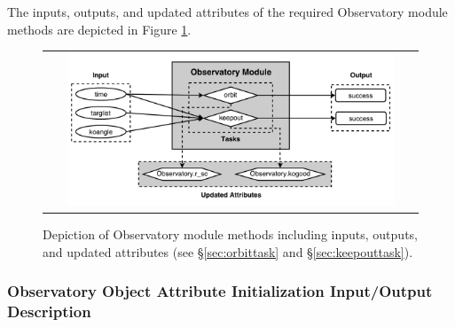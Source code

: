 \documentclass[cleanfoot]{asme2ej}
\newcommand{\reffig}[1]{Figure \ref{#1}}
\begin{document}
The inputs, outputs, and updated attributes of the required Observatory module methods are depicted in  \reffig{fig:observatorymodule}.

\begin{figure}[ht]
    \begin{center}
        \begin{tabular}{c}
             \includegraphics[width=0.9\textwidth]{observatory3}
        \end{tabular}
    \end{center}
    \caption{\label{fig:observatorymodule} Depiction of Observatory module methods including inputs, outputs, and updated attributes (see \S\ref{sec:orbittask} and \S\ref{sec:keepouttask}).}
\end{figure}

\label{sec:observatory}
\subsubsection{Observatory Object Attribute Initialization Input/Output Description}
\end{document}

